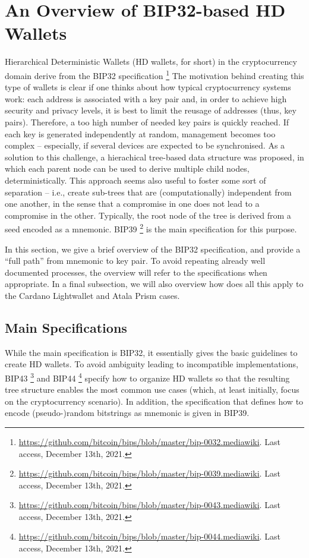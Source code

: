 \section{An Overview of BIP32-based HD Wallets}
\label{sec:bip32}

Hierarchical Deterministic Wallets (HD wallets, for short) in the cryptocurrency
domain derive from the BIP32 specification%
\footnote{\url{https://github.com/bitcoin/bips/blob/master/bip-0032.mediawiki}.
  Last access, December 13th, 2021.}
The motivation behind creating this type of wallets is clear if one thinks about
how typical cryptocurrency systems work: each address is associated with a key
pair and, in order to achieve high security and privacy levels, it is best to
limit the reusage of addresses (thus, key pairs). Therefore, a too high number
of needed key pairs is quickly reached. If each key is generated independently
at random, management becomes too complex -- especially, if several devices
are expected to be synchronised. As a solution to this challenge, a hierachical
tree-based data structure was proposed, in which each parent node can be used to
derive multiple child nodes, deterministically. This approach seems also useful
to foster some sort of separation -- i.e., create sub-trees that are
(computationally) independent from one another, in the sense that a compromise
in one does not lead to a compromise in the other. Typically, the root node
of the tree is derived from a seed encoded as a mnemonic. BIP39%
\footnote{\url{https://github.com/bitcoin/bips/blob/master/bip-0039.mediawiki}.
  Last access, December 13th, 2021.} is the main specification for this purpose.

In this section, we give a brief overview of the BIP32 specification, and
provide a ``full path'' from mnemonic to key pair. To avoid repeating already
well documented processes, the overview will refer to the specifications when
appropriate.
%
In a final subsection, we will also overview how does all this apply to the
Cardano Lightwallet and Atala Prism cases.

\subsection{Main Specifications}

While the main specification is BIP32, it essentially gives the basic guidelines
to create HD wallets. To avoid ambiguity leading to incompatible
implementations, BIP43%
\footnote{\url{https://github.com/bitcoin/bips/blob/master/bip-0043.mediawiki}.
  Last access, December 13th, 2021.} and BIP44%
\footnote{\url{https://github.com/bitcoin/bips/blob/master/bip-0044.mediawiki}.
  Last access, December 13th, 2021.} specify how to organize HD wallets so
that the resulting tree structure enables the most common use cases (which, at
least initially, focus on the cryptocurrency scenario). In addition, the
specification that defines how to encode (pseudo-)random bitstrings as
mnemonic is given in BIP39.

